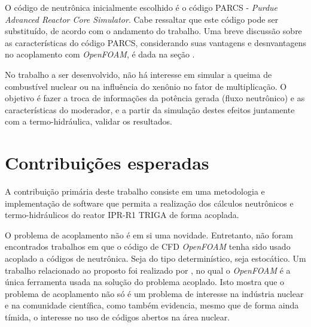\documentclass[12pt,openright,twoside,a4paper,english,french,spanish,brazil]{abntex2}
\begin{document}
O código de neutrônica inicialmente escolhido é o código PARCS 
- \textit{Purdue Advanced Reactor Core Simulator}. Cabe ressaltar que este código pode ser 
substituído, de acordo com o andamento do trabalho. 
Uma breve discussão sobre as características do código PARCS, considerando suas vantagens e desnvantagens 
no acoplamento com \textit{OpenFOAM}, é dada na seção .

No trabalho a ser desenvolvido, não há interesse em simular a queima de combustível nuclear ou na influência 
do xenônio no fator de multiplicação. O objetivo é fazer a troca de informações da potência 
gerada (fluxo neutrônico) e as características do moderador, e a partir da simulação 
destes efeitos juntamente com a termo-hidráulica, validar os resultados. 

\section*{Contribuições esperadas}

A contribuição primária deste trabalho consiste em uma metodologia e implementação de software 
que permita a realização dos cálculos neutrônicos e termo-hidráulicos do reator IPR-R1 TRIGA 
de forma acoplada.

O problema de acoplamento não é em si uma novidade. Entretanto, não foram encontrados trabalhos em que o 
código de CFD \textit{OpenFOAM} tenha sido usado acoplado a códigos de neutrônica. 
Seja do tipo determinístico, 
seja estocático. Um trabalho relacionado ao proposto foi realizado por \cite{Jareteg2012}, no qual 
o \textit{OpenFOAM} é a única ferramenta usada na solução do problema acoplado. Isto mostra que o problema 
de acoplamento não só é um problema de interesse na indústria nuclear e na comunidade científica, como também 
evidencia, mesmo que de forma ainda tímida, o interesse no uso de códigos abertos na área nuclear.
\end{document}
